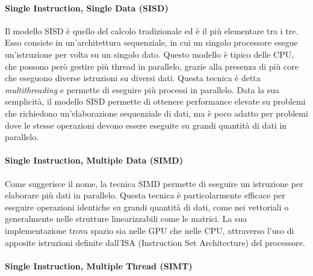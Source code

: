 \paragraph{Single Instruction, Single Data (SISD)}
\label{para:simd}

Il modello SISD è quello del calcolo tradizionale ed è il più elementare tra i
tre. Esso consiste in un'architettura sequenziale, in cui un singolo processore
esegue un'istruzione per volta su un singolo dato. Questo modello è tipico delle
CPU, che possono però gestire più thread in parallelo, grazie alla presenza di più
core che eseguono diverse istruzioni su diversi dati. Questa tecnica è detta
\textit{multithreading} e permette di eseguire più processi in parallelo. Data
la sua semplicità, il modello SISD permette di ottenere performance elevate su problemi
che richiedono un'elaborazione sequenziale di dati, ma è poco adatto per
problemi dove le stesse operazioni devono essere eseguite su grandi quantità di
dati in parallelo.

\paragraph{Single Instruction, Multiple Data (SIMD)}
\label{para:simd}

Come suggerisce il nome, la tecnica SIMD permette di eseguire un istruzione per elaborare
più dati in parallelo. Questa tecnica è particolarmente efficace per eseguire
operazioni identiche su grandi quantità di dati, come nei vettoriali o generalmente
nelle strutture linearizzabili come le matrici. La sua implementazione trova
spazio sia nelle GPU che nelle CPU, attraverso l'uso di apposite istruzioni definite
dall'ISA (Instruction Set Architecture) del processore.

\paragraph{Single Instruction, Multiple Thread (SIMT)\cite{generalpurposegpu}}
\label{para:simt}

